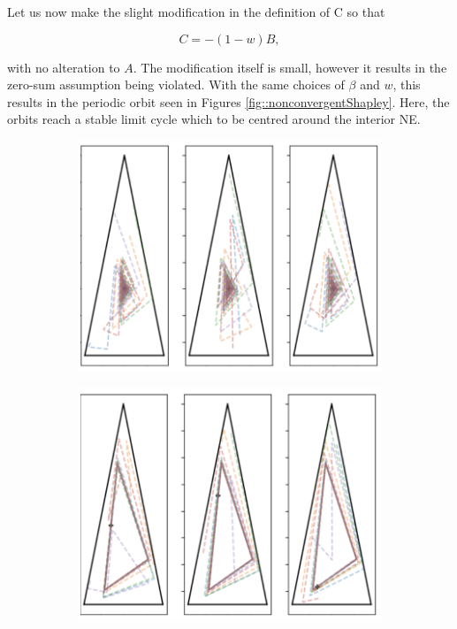 \documentclass{article}
\theoremstyle{definition}
\begin{document}
  Let us now make the slight modification in the definition of C so that

  \begin{equation} \label{eq::nonzeroSumShapley}
    C  = - (1 - w) B, 
  \end{equation}

  with no alteration to $A$. The modification itself is small, however it results in the zero-sum
  assumption being violated. With the same choices of $\beta$ and $w$, this results in the periodic
  orbit seen in Figures \ref{fig::nonconvergentShapley}. Here,
  the orbits reach a stable limit cycle which to be centred around the interior NE.

  \begin{figure}[t]
    \centering
    \begin{subfigure}[b]{0.45 \textwidth}
      \includegraphics[width = \textwidth]{Figures/convergentShapley.png}
    \caption{\label{fig::convergentShapley}}
    \end{subfigure}
    \begin{subfigure}[b]{0.45 \textwidth}
      \includegraphics[width = \textwidth]{Figures/nonConvergentShapley.png}

\end{subfigure}
\end{figure}
\end{document}
